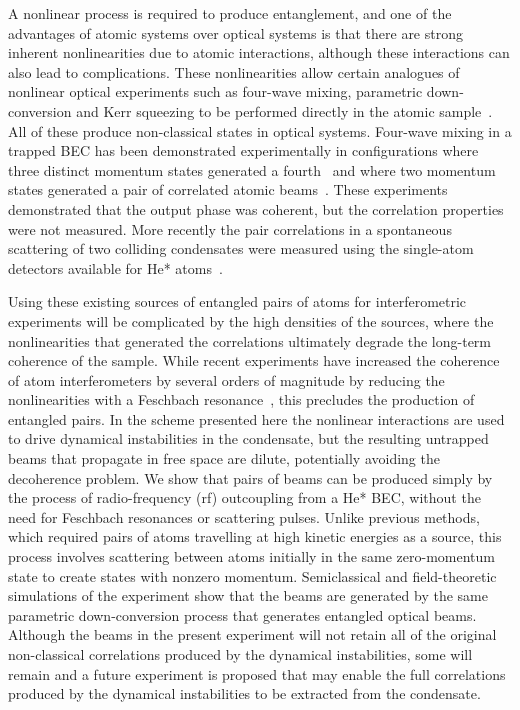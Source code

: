 A nonlinear process is required to produce entanglement, and one of the advantages of atomic systems over optical systems is that there are strong inherent nonlinearities due to atomic interactions, although these interactions can also lead to complications. These nonlinearities allow certain analogues of nonlinear optical experiments such as four-wave mixing, parametric down-conversion and Kerr squeezing to be performed directly in the atomic sample~\citep{WallsMilburn}. All of these produce non-classical states in optical systems. Four-wave mixing in a trapped BEC has been demonstrated experimentally in configurations where three distinct momentum states generated a fourth~\citep{Deng:1999qy} and where two momentum states generated a pair of correlated atomic beams~\citep{Vogels:2002}. These experiments demonstrated that the output phase was coherent, but the correlation properties were not measured. More recently the pair correlations in a spontaneous scattering of two colliding condensates were measured using the single-atom detectors available for He* atoms~\citep{Perrin:2007}.

Using these existing sources of entangled pairs of atoms for interferometric experiments will be complicated by the high densities of the sources, where the nonlinearities that generated the correlations ultimately degrade the long-term coherence of the sample. While recent experiments have increased the coherence of atom interferometers by several orders of magnitude by reducing the nonlinearities with a Feschbach resonance~\citep{Fattori:2008,Gustavsson:2008}, this precludes the production of entangled pairs.  In the scheme presented here the nonlinear interactions are used to drive dynamical instabilities in the condensate, but the resulting untrapped beams that propagate in free space are dilute, potentially avoiding the decoherence problem.  We show that pairs of beams can be produced simply by the process of radio-frequency (rf) outcoupling from a He* BEC, without the need for Feschbach resonances or scattering pulses.  Unlike previous methods, which required pairs of atoms travelling at high kinetic energies as a source, this process involves scattering between atoms initially in the same zero-momentum state to create states with nonzero momentum.  Semiclassical and field-theoretic simulations of the experiment show that the beams are generated by the same parametric down-conversion process that generates entangled optical beams.  Although the beams in the present experiment will not retain all of the original non-classical correlations produced by the dynamical instabilities, some will remain and a future experiment is proposed that may enable the full correlations produced by the dynamical instabilities to be extracted from the condensate.

